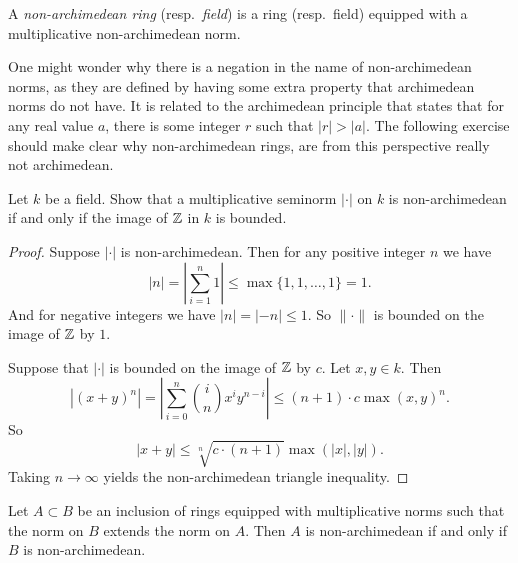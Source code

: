 \begin{definition}
	A \emph{non-archimedean ring} (resp.\ \emph{field}) is a ring (resp.\ field) equipped with a multiplicative non-archimedean norm. 
\end{definition}

One might wonder why there is a negation in the name of non-archimedean norms, as they are defined by having some extra property that archimedean norms do not have. 
It is related to the archimedean principle that states that for any real value $a$, there is some integer $r$ such that $|r| > |a|$. 
The following exercise should make clear why non-archimedean rings, are from this perspective really not archimedean.
\begin{exercise}\label{exercise:archimedean}
	Let $k$ be a field.
	Show that a multiplicative seminorm $|\cdot |$ on $k$ is non-archimedean if and only if the image of $\mathbb{Z}$ in $k$ is bounded. 
\end{exercise}
\begin{proof}
	Suppose $|\cdot |$ is non-archimedean. Then for any positive integer $n$ we have \[
	|n| = \left|\sum_{i = 1}^{n} 1 \right| \le \max \{1, 1, \ldots, 1\}  = 1
	.\] 
	And for negative integers we have $|n| = |-n| \le 1$. So $\|\cdot \|$ is bounded on the image of $\mathbb{Z}$ by $1$. 


	Suppose that $|\cdot |$ is bounded on the image of $\mathbb{Z}$ by $c$. 
	Let $x, y \in k$. Then \[
		|(x + y)^{n}| = \left| \sum_{i = 0}^{n} \binom{i}{n} x ^{i} y ^{n-i}\right| \le (n + 1)\cdot c \max(x, y)^{n}
	.\] 
	So \[
		|x + y| \le \sqrt[n]{c\cdot (n + 1)}  \max(|x|, |y|)
	.\] 
	Taking $n \to \infty$ yields the non-archimedean triangle inequality. 
\end{proof}

\begin{corollary}
	Let $A \subset  B$ be an inclusion of rings  equipped with multiplicative norms such that the norm on $B$ extends the norm on $A$. 
	Then $A$ is non-archimedean if and only if $B$ is non-archimedean. 
\end{corollary}

